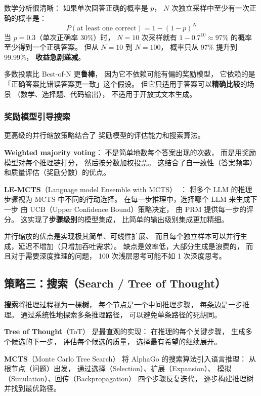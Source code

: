 数学分析很清晰：
如果单次回答正确的概率是 $p$，
$N$ 次独立采样中至少有一次正确的概率是：
\begin{equation}
  P(\text{at least one correct}) = 1 - (1-p)^N
\end{equation}
当 $p = 0.3$（单次正确率 30\%）时，
$N = 10$ 次采样就有 $1 - 0.7^{10} \approx 97\%$ 的概率
至少得到一个正确答案。
但从 $N = 10$ 到 $N = 100$，
概率只从 97\% 提升到 99.99\%，
\textbf{收益急剧递减}。

多数投票比 Best-of-N 更\textbf{鲁棒}，
因为它不依赖可能有偏的奖励模型，
它依赖的是「正确答案比错误答案更一致」这个假设。
但它只适用于答案可以\textbf{精确比较}的场景
（数学、选择题、代码输出），
不适用于开放式文本生成。

\subsubsection{奖励模型引导搜索}

更高级的并行缩放策略结合了
奖励模型的评估能力和搜索算法。

\textbf{Weighted majority voting}：
不是简单地数每个答案出现的次数，
而是用奖励模型对每个推理链打分，
然后按分数加权投票。
这结合了自一致性（答案频率）
和质量评估（奖励分数）的优点。

\textbf{LE-MCTS}（Language model Ensemble with MCTS）~\cite{park2025lemcts}：
将多个 LLM 的推理步骤视为
MCTS 中不同的行动选择。
在每一步推理中，选择哪个 LLM 来生成下一步
由 UCB（Upper Confidence Bound）策略决定，
由 PRM 提供每一步的评分。
这实现了\textbf{步骤级别}的模型集成，
比简单的输出级别集成更加精细。

并行缩放的优点是实现极其简单、可线性扩展、
而且每个独立样本可以并行生成，延迟不增加（只增加吞吐需求）。
缺点是效率低，大部分生成是浪费的，
而且对于需要深度推理的问题，
100 次浅层思考可能不如 1 次深度思考。

\subsection{策略三：搜索（Search / Tree of Thought）}

\textbf{搜索}将推理过程视为一棵\textbf{树}，
每个节点是一个中间推理步骤，
每条边是一步推理。
通过系统性地探索多条推理路径，
可以避免单条路径的死胡同。

\textbf{Tree of Thought}（ToT）
是最直观的实现：
在推理的每个关键步骤，
生成多个候选的下一步，
评估每个候选的质量，
选择最有希望的继续展开。

\textbf{MCTS}（Monte Carlo Tree Search）
将 AlphaGo 的搜索算法引入语言推理：
从根节点（问题）出发，
通过选择（Selection）、扩展（Expansion）、
模拟（Simulation）、回传（Backpropagation）
四个步骤反复迭代，
逐步构建推理树并找到最优路径。

